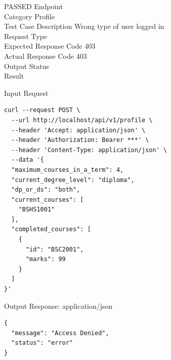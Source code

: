 \begin{testcase}{20}{PASSED}
Endpoint \hfill {}\\
Category \hfill Profile\\
Test Case Description \hfill Wrong type of user logged in\\

Request Type    \hfill {}\\
Expected Response Code    \hfill 403\\
Actual Response Code    \hfill 403\\

Output Status \hfill {}\\
Result \hfill {}

\begin{ipblock}{Input Request}
\begin{verbatim}
curl --request POST \
  --url http://localhost/api/v1/profile \
  --header 'Accept: application/json' \
  --header 'Authorization: Bearer ***' \
  --header 'Content-Type: application/json' \
  --data '{
  "maximum_courses_in_a_term": 4,
  "current_degree_level": "diploma",
  "dp_or_ds": "both",
  "current_courses": [
    "BSHS1001"
  ],
  "completed_courses": [
    {
      "id": "BSC2001",
      "marks": 99
    }
  ]
}'
\end{verbatim}
\end{ipblock}

\begin{opblock}{Output Response: application/json}
\begin{verbatim}
{
  "message": "Access Denied",
  "status": "error"
}
\end{verbatim}
\end{opblock}
\end{testcase}


